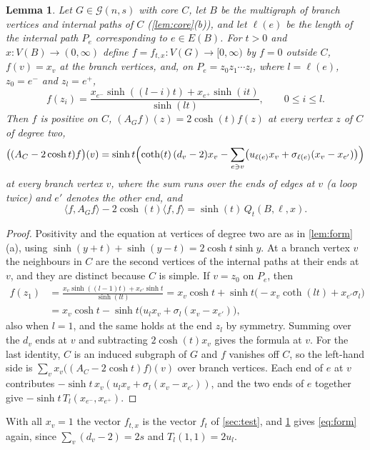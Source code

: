 \documentclass[11pt]{article}
\newtheorem{lemma}[theorem]{Lemma}
\theoremstyle{definition}
\theoremstyle{remark}
\newcommand{\G}{\mathcal{G}}
\begin{document}
\begin{lemma}\label{lem:Q}
Let $G\in\G(n,s)$ with core $C$, let $B$ be the multigraph of branch vertices and internal paths of $C$
(\cref{lem:core}(b)), and let $\ell(e)$ be the length of the internal path $P_e$ corresponding to $e\in E(B)$. For $t>0$
and $x\colon V(B)\to(0,\infty)$ define $f=f_{t,x}\colon V(G)\to[0,\infty)$ by $f=0$ outside $C$, $f(v)=x_v$ at the branch
vertices, and, on $P_e=z_0z_1\cdots z_l$, where $l=\ell(e)$, $z_0=e^-$ and $z_l=e^+$,
\[
f(z_i)=\frac{x_{e^-}\sinh((l-i)t)+x_{e^+}\sinh(it)}{\sinh(lt)},\qquad 0\le i\le l .
\]
Then $f$ is positive on $C$, $(A_Gf)(z)=2\cosh(t)f(z)$ at every vertex $z$ of $C$ of degree two,
\[
\bigl((A_C-2\cosh t)f\bigr)(v)=\sinh t\Bigl(\coth(t)\,(d_v-2)x_v-\sum_{e\ni v}\bigl(u_{\ell(e)}x_v+\sigma_{\ell(e)}(x_v-x_{e'})\bigr)\Bigr)
\]
at every branch vertex $v$, where the sum runs over the ends of edges at $v$ (a loop twice) and $e'$ denotes the other
end, and
\[
\langle f,A_Gf\rangle-2\cosh(t)\langle f,f\rangle=\sinh(t)\,Q_t(B,\ell,x).
\]
\end{lemma}

\begin{proof}
Positivity and the equation at vertices of degree two are as in \cref{lem:form}(a), using
$\sinh(y+t)+\sinh(y-t)=2\cosh t\sinh y$. At a branch vertex $v$ the neighbours in $C$ are the second vertices of the
internal paths at their ends at $v$, and they are distinct because $C$ is simple. If $v=z_0$ on $P_e$, then
\begin{align*}
f(z_1)&=\frac{x_v\sinh((l-1)t)+x_{e'}\sinh t}{\sinh(lt)}=x_v\cosh t+\sinh t\bigl(-x_v\coth(lt)+x_{e'}\sigma_l\bigr)\\
&=x_v\cosh t-\sinh t\bigl(u_lx_v+\sigma_l(x_v-x_{e'})\bigr),
\end{align*}
also when $l=1$, and the same holds at the end $z_l$ by symmetry. Summing over the $d_v$ ends at $v$ and subtracting
$2\cosh(t)x_v$ gives the formula at $v$. For the last identity, $C$ is an induced subgraph of $G$ and $f$ vanishes off
$C$, so the left-hand side is $\sum_vx_v\bigl((A_C-2\cosh t)f\bigr)(v)$ over branch vertices. Each end of $e$ at $v$
contributes $-\sinh t\,x_v(u_lx_v+\sigma_l(x_v-x_{e'}))$, and the two ends of $e$ together give $-\sinh t\,T_l(x_{e^-},
x_{e^+})$.
\end{proof}

With all $x_v=1$ the vector $f_{t,x}$ is the vector $f_t$ of \cref{sec:test}, and \cref{lem:Q} gives \eqref{eq:form} again, since
$\sum_v(d_v-2)=2s$ and $T_l(1,1)=2u_l$.
\end{document}
